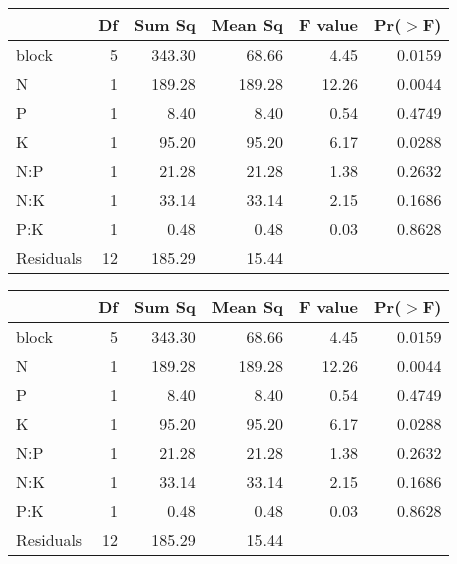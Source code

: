 \begin{table}[ht]
\centering
\begin{tabular}{lrrrrr}
  \hline
 & Df & Sum Sq & Mean Sq & F value & Pr($>$F) \\ 
  \hline
block & 5 & 343.30 & 68.66 & 4.45 & 0.0159 \\ 
  N & 1 & 189.28 & 189.28 & 12.26 & 0.0044 \\ 
  P & 1 & 8.40 & 8.40 & 0.54 & 0.4749 \\ 
  K & 1 & 95.20 & 95.20 & 6.17 & 0.0288 \\ 
  N:P & 1 & 21.28 & 21.28 & 1.38 & 0.2632 \\ 
  N:K & 1 & 33.14 & 33.14 & 2.15 & 0.1686 \\ 
  P:K & 1 & 0.48 & 0.48 & 0.03 & 0.8628 \\ 
  Residuals & 12 & 185.29 & 15.44 &  &  \\ 
   \hline
\end{tabular}
\end{table}
\begin{table}[ht]
\centering
\begin{tabular}{lrrrrr}
  \hline
 & Df & Sum Sq & Mean Sq & F value & Pr($>$F) \\ 
  \hline
block & 5 & 343.30 & 68.66 & 4.45 & 0.0159 \\ 
  N & 1 & 189.28 & 189.28 & 12.26 & 0.0044 \\ 
  P & 1 & 8.40 & 8.40 & 0.54 & 0.4749 \\ 
  K & 1 & 95.20 & 95.20 & 6.17 & 0.0288 \\ 
  N:P & 1 & 21.28 & 21.28 & 1.38 & 0.2632 \\ 
  N:K & 1 & 33.14 & 33.14 & 2.15 & 0.1686 \\ 
  P:K & 1 & 0.48 & 0.48 & 0.03 & 0.8628 \\ 
  Residuals & 12 & 185.29 & 15.44 &  &  \\ 
   \hline
\end{tabular}
\end{table}
